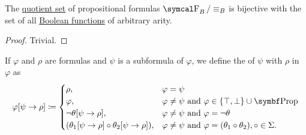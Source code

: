 \begin{theorem}\label{thm:propositional_logic_boolean_algebra}
  The \hyperref[def:equivalence_relation]{quotient set} of propositional formulas \( \CF_B / \equiv_B \) is bijective with the set of all \hyperref[def:boolean_function]{Boolean functions} of arbitrary arity.
\end{theorem}
\begin{proof}
  Trivial.
\end{proof}

\begin{definition}\label{def:propositional_substition}
  If \( \varphi \) and \( \rho \) are formulas and \( \psi \) is a subformula of \( \varphi \), we define the  of \( \psi \) with \( \rho \) in \( \varphi \) as
  \begin{equation*}
    \varphi[\psi \to \rho] \coloneqq \begin{cases}
      \rho,                                                    &\varphi = \psi                                                                        \\
      \varphi,                                                 &\varphi \neq \psi \text{ and } \varphi \in \{ \top, \bot \} \cup \Bold{Prop}          \\
      \neg \theta[\psi \to \rho],                              &\varphi \neq \psi \text{ and } \varphi = \neg \theta                                  \\
      (\theta_1[\psi \to \rho] \circ \theta_2[\psi \to \rho]), &\varphi \neq \psi \text{ and } \varphi = (\theta_1 \circ \theta_2), \circ \in \Sigma.
    \end{cases}
  \end{equation*}
\end{definition}

